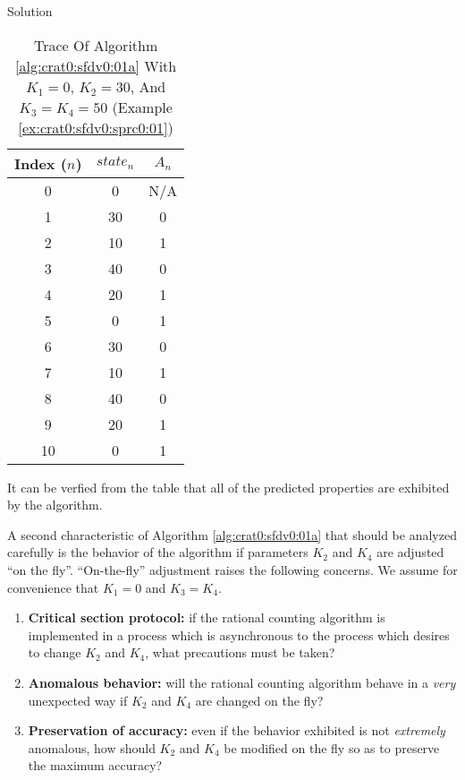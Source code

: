 \begin{vworkexampleparsection}{Solution}
\begin{table}
\caption{Trace Of Algorithm \ref{alg:crat0:sfdv0:01a} With 
         $K_1=0$, $K_2=30$, And $K_3=K_4=50$ (Example \ref{ex:crat0:sfdv0:sprc0:01})}
\label{tbl:crat0:sfdv0:sprc0:01}
\begin{center}
\begin{tabular}{|c|c|c|}
\hline
Index ($n$) & $state_n$  & $A_n$ \\
\hline
\hline
  0    &    0    &   N/A         \\
\hline
  1    &   30    &     0         \\
\hline
  2    &   10    &     1         \\
\hline
  3    &   40    &     0         \\
\hline
  4    &   20    &     1         \\
\hline
  5    &    0    &     1         \\
\hline
  6    &   30    &     0         \\
\hline
  7    &   10    &     1         \\
\hline
  8    &   40    &     0         \\
\hline
  9    &   20    &     1         \\
\hline
 10    &    0    &     1         \\
\hline
\end{tabular}
\end{center}
\end{table}

It can be verfied from the table that all of the
predicted properties are exhibited by the
algorithm.
\end{vworkexampleparsection}
\vworkexamplefooter{}

A second characteristic of Algorithm \ref{alg:crat0:sfdv0:01a}
that should be analyzed carefully is the behavior
of the algorithm if parameters $K_2$ and $K_4$ are adjusted 
``on the fly''.  ``On-the-fly'' adjustment
raises the following concerns.  We assume for convenience
that $K_1=0$ and $K_3=K_4$.

\begin{enumerate}
\item \label{enum:crat0:sfdv0:sprc0:01:01}
      \textbf{Critical section protocol:}  if the
      rational counting algorithm is implemented in a process which
      is asynchronous to the process which desires to change
      $K_2$ and $K_4$, what precautions must be taken?
\item \label{enum:crat0:sfdv0:sprc0:01:02}
      \textbf{Anomalous behavior:}  will the rational
      counting algorithm behave in a \emph{very} unexpected way
      if $K_2$ and $K_4$ are changed on the fly?
\item \label{enum:crat0:sfdv0:sprc0:01:03}
      \textbf{Preservation of accuracy:} even if the behavior
      exhibited is not \emph{extremely} anomalous, how should
      $K_2$ and $K_4$ be modified on the fly so as to preserve the
      maximum accuracy?
\end{enumerate}

